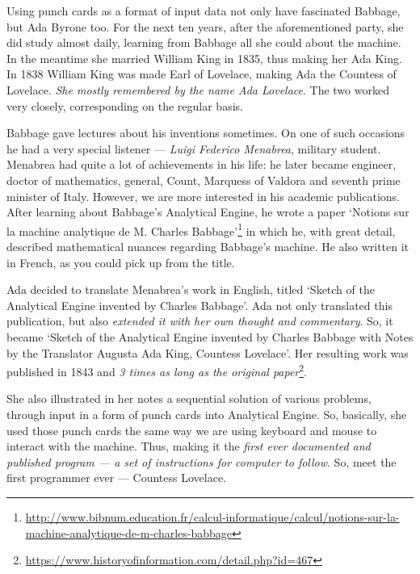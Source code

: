 \documentclass[../../what-is-computer]{subfiles}
\begin{document}
    Using punch cards as a format of input data not only have fascinated Babbage, but Ada Byrone too. For the next ten years, after the aforementioned party, she
    did study almost daily, learning from Babbage all she could about the machine. In the meantime she married William King in 1835, thus making her Ada King. In 1838
    William King was made Earl of Lovelace, making Ada the Countess of Lovelace. \emph{She mostly remembered by the name Ada Lovelace}. The two worked very closely,
    corresponding on the regular basis. \par

    Babbage gave lectures about his inventions sometimes. On one of such occasions he had a very special listener --- \emph{Luigi Federico Menabrea}, military student. Menabrea
    had quite a lot of achievements in his life: he later became engineer, doctor of mathematics, general, Count, Marquess of Valdora and seventh prime minister of Italy. 
    However, we are more interested in his academic publications. After learning about Babbage's Analytical Engine, he wrote a paper 
    `Notions sur la machine analytique de M. Charles Babbage'\footnote{\href{http://www.bibnum.education.fr/calcul-informatique/calcul/notions-sur-la-machine-analytique-de-m-charles-babbage}
    {http://www.bibnum.education.fr/calcul-informatique/calcul/notions-sur-la-machine-analytique-de-m-charles-babbage}} in which he, with great detail, described mathematical
    nuances regarding Babbage's machine. He also written it in French, as you could pick up from the title. \par

    Ada decided to translate Menabrea's work in English, titled `Sketch of the Analytical Engine invented by Charles Babbage'. Ada not only translated this publication, but
    also \emph{extended it with her own thought and commentary}. So, it became `Sketch of the Analytical Engine invented by Charles Babbage with Notes by the Translator Augusta Ada King, Countess Lovelace'.
    Her resulting work was published in 1843 and \emph{3 times as long as the original paper}\footnote{\href{https://www.historyofinformation.com/detail.php?id=467}{https://www.historyofinformation.com/detail.php?id=467}}. \par


    She also illustrated in her notes a sequential solution of various problems, through input in a form of punch cards into Analytical Engine. So, basically, she used 
    those punch cards the same way we are using keyboard and mouse to interact with the machine. Thus, making it the \emph{first ever documented and published program --- a 
    set of instructions for computer to follow}. So, meet the first programmer ever --- Countess Lovelace. \par
\end{document}
